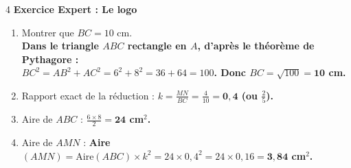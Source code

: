 \documentclass[a4paper]{book}
\begin{document}
{    \begin{exerciceNote}{4}
        \textbf{Exercice Expert : Le logo}
        \begin{enumerate}
            \item Montrer que $BC = 10$ cm. \\
            \textbf{Dans le triangle $ABC$ rectangle en $A$, d'après le théorème de Pythagore : \\
            $BC^2 = AB^2 + AC^2 = 6^2 + 8^2 = 36 + 64 = 100$. Donc $BC = \sqrt{100} = \mathbf{10}$ cm.}
            \item Rapport exact de la réduction : \textbf{$k = \frac{MN}{BC} = \frac{4}{10} = \mathbf{0,4}$ (ou $\frac{2}{5}$).}
            \item Aire de $ABC$ : \textbf{$\frac{6 \times 8}{2} = \mathbf{24}$ cm$^2$.}
            \item Aire de $AMN$ : \textbf{Aire$(AMN) = \text{Aire}(ABC) \times k^2 = 24 \times 0,4^2 = 24 \times 0,16 = \mathbf{3,84}$ cm$^2$.}
        \end{enumerate}
    \end{exerciceNote}
}
\end{document}
